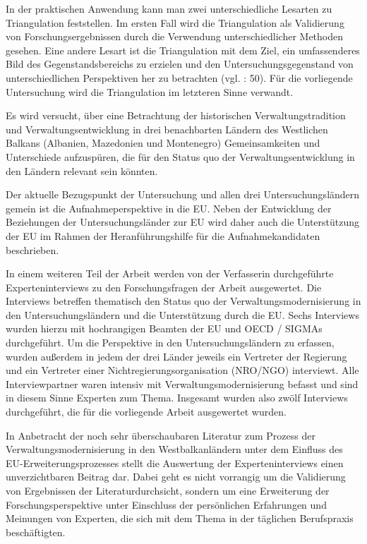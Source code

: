 In der praktischen Anwendung kann man zwei unterschiedliche Lesarten zu Triangulation feststellen. Im ersten Fall wird die Triangulation als Validierung von Forschungsergebnissen durch die Verwendung unterschiedlicher Methoden gesehen. Eine andere Lesart ist die Triangulation mit dem Ziel, ein umfassenderes Bild des Gegenstandsbereichs zu erzielen und den Untersuchungsgegenstand von unterschiedlichen Perspektiven her zu betrachten (vgl. \cite{kelle} : 50). Für die vorliegende Untersuchung wird die Triangulation im letzteren Sinne verwandt.
\par
Es wird versucht, über eine Betrachtung der historischen Verwaltungstradition und Verwaltungsentwicklung in drei benachbarten Ländern des Westlichen Balkans (Albanien, Mazedonien und Montenegro) Gemeinsamkeiten und Unterschiede aufzuspüren, die für den Status quo der Verwaltungsentwicklung in den Ländern relevant sein könnten.\par
Der aktuelle Bezugspunkt der Untersuchung und allen drei Untersuchungsländern gemein ist die Aufnahmeperspektive in die EU. Neben der Entwicklung der Beziehungen der Untersuchungsländer zur EU wird daher auch die Unterstützung der EU im Rahmen der Heranführungshilfe für die Aufnahmekandidaten beschrieben.\par
In einem weiteren Teil der Arbeit werden von der Verfasserin durchgeführte Experteninterviews zu den Forschungsfragen der Arbeit ausgewertet. Die Interviews betreffen thematisch den Status quo der Verwaltungsmodernisierung in den Untersuchungsländern und die Unterstützung durch die EU. Sechs Interviews wurden hierzu mit hochrangigen Beamten der EU und OECD / SIGMAs durchgeführt. Um die Perspektive in den Untersuchungsländern zu erfassen, wurden außerdem in jedem der drei Länder jeweils ein Vertreter der Regierung und ein Vertreter einer Nichtregierungsorganisation (NRO/NGO) interviewt. Alle Interviewpartner waren intensiv mit Verwaltungsmodernisierung befasst und sind in diesem Sinne Experten zum Thema. Insgesamt wurden also zwölf Interviews durchgeführt, die für die vorliegende Arbeit ausgewertet wurden.
\par
In Anbetracht der noch sehr überschaubaren Literatur zum Prozess der Verwaltungsmodernisierung in den Westbalkanländern unter dem Einfluss des EU-Erweiterungsprozesses stellt die Auswertung der Experteninterviews einen unverzichtbaren Beitrag dar. Dabei geht es nicht vorrangig um die Validierung von Ergebnissen der Literaturdurchsicht, sondern um eine Erweiterung der Forschungsperspektive unter Einschluss der persönlichen Erfahrungen und Meinungen von Experten, die sich mit dem Thema in der täglichen Berufspraxis beschäftigten.\par
